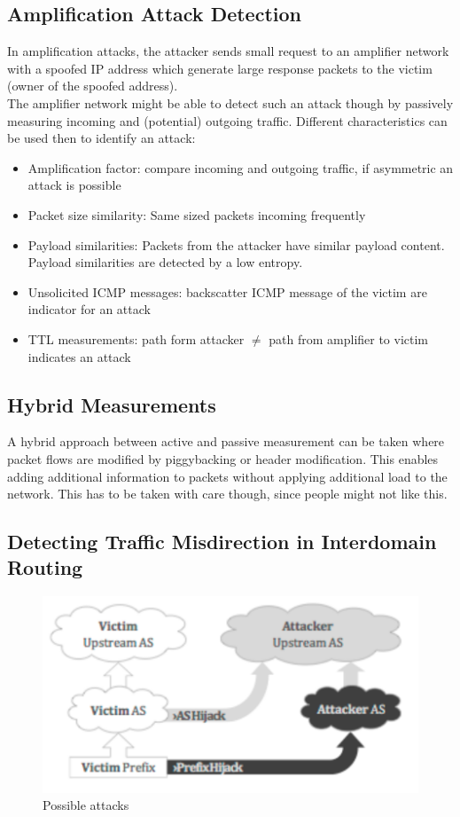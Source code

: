 \subsection{Amplification Attack Detection}
In amplification attacks, the attacker sends small request to an amplifier network with a spoofed IP address which generate large response packets to the victim (owner of the spoofed address).\\
The amplifier network might be able to detect such an attack though by passively measuring incoming and (potential) outgoing traffic.
Different characteristics can be used then to identify an attack:
\begin{itemize}
  \item Amplification factor: compare incoming and outgoing traffic, if asymmetric an attack is possible
  \item Packet size similarity: Same sized packets incoming frequently
  \item Payload similarities: Packets from the attacker have similar payload content. Payload similarities are detected by a low entropy.
  \item Unsolicited ICMP messages: backscatter ICMP message of the victim are indicator for an attack
  \item TTL measurements: path form attacker $\neq$ path from amplifier to victim indicates an attack
\end{itemize}

\subsection{Hybrid Measurements}
A hybrid approach between active and passive measurement can be taken where packet flows are modified by piggybacking or header modification.
This enables adding additional information to packets without applying additional load to the network.
This has to be taken with care though, since people might not like this.

\subsection{Detecting Traffic Misdirection in Interdomain Routing}
\begin{figure}[H]
  \centering
  \includegraphics[width=.6\textwidth]{figures/as_and_prefix_hijacking.png}
  \caption{Possible attacks}\label{fig:fig:as_and_prefix_hijacking}
\end{figure}

